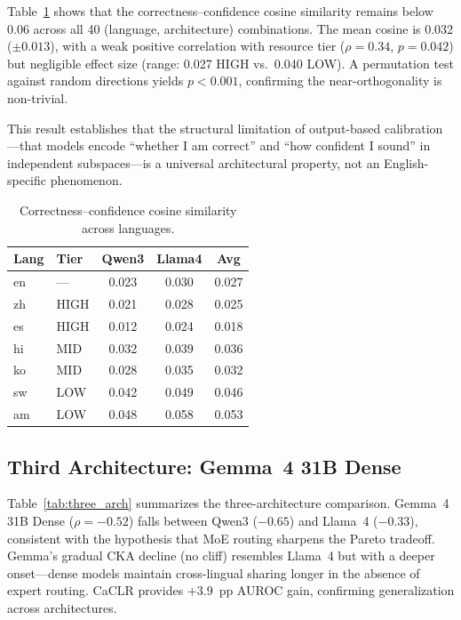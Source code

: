 \documentclass[11pt,a4paper]{article}
\begin{document}
Table~\ref{tab:orthogonality} shows that the correctness--confidence cosine similarity remains below 0.06 across all 40 (language, architecture) combinations.
The mean cosine is 0.032 ($\pm 0.013$), with a weak positive correlation with resource tier ($\rho = 0.34$, $p = 0.042$) but negligible effect size (range: 0.027 HIGH vs.\ 0.040 LOW).
A permutation test against random directions yields $p < 0.001$, confirming the near-orthogonality is non-trivial.

This result establishes that the structural limitation of output-based calibration---that models encode ``whether I am correct'' and ``how confident I sound'' in independent subspaces---is a universal architectural property, not an English-specific phenomenon.

\begin{table}[t]
\centering
\caption{Correctness--confidence cosine similarity across languages.}
\label{tab:orthogonality}
\small
\begin{tabular}{llccc}
\toprule
\textbf{Lang} & \textbf{Tier} & \textbf{Qwen3} & \textbf{Llama4} & \textbf{Avg} \\
\midrule
en & ---  & 0.023 & 0.030 & 0.027 \\
zh & HIGH & 0.021 & 0.028 & 0.025 \\
es & HIGH & 0.012 & 0.024 & 0.018 \\
hi & MID  & 0.032 & 0.039 & 0.036 \\
ko & MID  & 0.028 & 0.035 & 0.032 \\
sw & LOW  & 0.042 & 0.049 & 0.046 \\
am & LOW  & 0.048 & 0.058 & 0.053 \\
\bottomrule
\end{tabular}
\end{table}

\subsection{Third Architecture: Gemma~4 31B Dense}
\label{sec:gemma}

Table~\ref{tab:three_arch} summarizes the three-architecture comparison.
Gemma~4 31B Dense ($\rho = -0.52$) falls between Qwen3 ($-0.65$) and Llama~4 ($-0.33$), consistent with the hypothesis that MoE routing sharpens the Pareto tradeoff.
Gemma's gradual CKA decline (no cliff) resembles Llama~4 but with a deeper onset---dense models maintain cross-lingual sharing longer in the absence of expert routing.
CaCLR provides $+3.9$~pp AUROC gain, confirming generalization across architectures.
\end{document}
